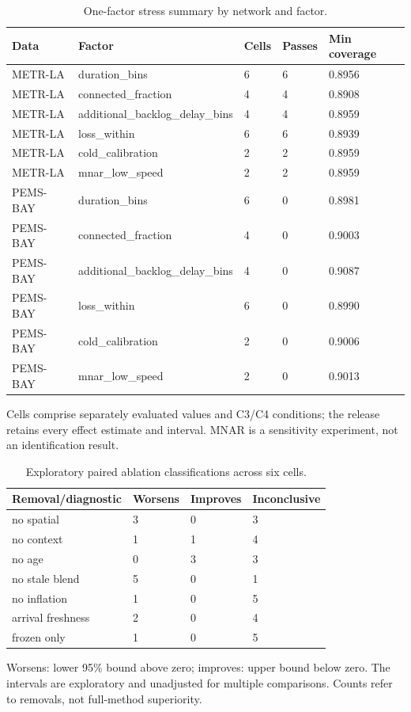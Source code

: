 \begin{table}[p]
\caption{One-factor stress summary by network and factor.}\label{tab:stress}
\centering\small
\begin{tabular}{lllll}\toprule
Data & Factor & Cells & Passes & Min coverage \\\midrule
METR-LA & duration\_bins & 6 & 6 & 0.8956 \\
METR-LA & connected\_fraction & 4 & 4 & 0.8908 \\
METR-LA & additional\_backlog\_delay\_bins & 4 & 4 & 0.8959 \\
METR-LA & loss\_within & 6 & 6 & 0.8939 \\
METR-LA & cold\_calibration & 2 & 2 & 0.8959 \\
METR-LA & mnar\_low\_speed & 2 & 2 & 0.8959 \\
PEMS-BAY & duration\_bins & 6 & 0 & 0.8981 \\
PEMS-BAY & connected\_fraction & 4 & 0 & 0.9003 \\
PEMS-BAY & additional\_backlog\_delay\_bins & 4 & 0 & 0.9087 \\
PEMS-BAY & loss\_within & 6 & 0 & 0.8990 \\
PEMS-BAY & cold\_calibration & 2 & 0 & 0.9006 \\
PEMS-BAY & mnar\_low\_speed & 2 & 0 & 0.9013 \\
\bottomrule\end{tabular}
\par\smallskip\footnotesize Cells comprise separately evaluated values and C3/C4 conditions; the release retains every effect estimate and interval. MNAR is a sensitivity experiment, not an identification result.
\end{table}\clearpage
\begin{table}[p]
\caption{Exploratory paired ablation classifications across six cells.}\label{tab:ablations}
\centering\small
\begin{tabular}{llll}\toprule
Removal/diagnostic & Worsens & Improves & Inconclusive \\\midrule
no spatial & 3 & 0 & 3 \\
no context & 1 & 1 & 4 \\
no age & 0 & 3 & 3 \\
no stale blend & 5 & 0 & 1 \\
no inflation & 1 & 0 & 5 \\
arrival freshness & 2 & 0 & 4 \\
frozen only & 1 & 0 & 5 \\
\bottomrule\end{tabular}
\par\smallskip\footnotesize Worsens: lower 95\% bound above zero; improves: upper bound below zero. The intervals are exploratory and unadjusted for multiple comparisons. Counts refer to removals, not full-method superiority.
\end{table}\clearpage
